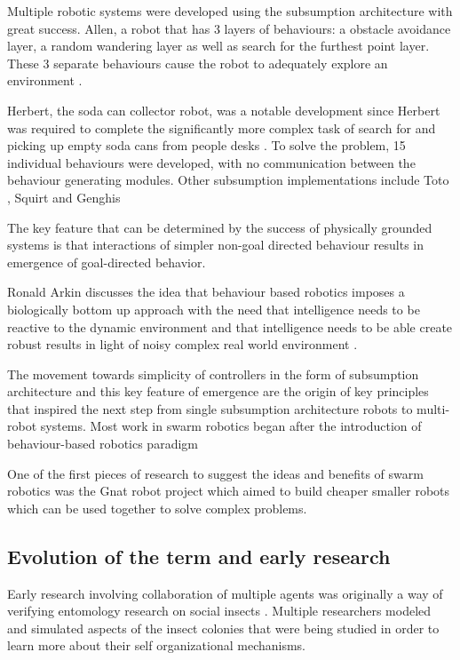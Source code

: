 Multiple robotic systems were developed using the subsumption architecture with great success. Allen, a robot that has 3 layers of behaviours: a obstacle avoidance layer, a random wandering layer as well as search for the furthest point layer. These 3 separate behaviours cause the robot to adequately explore an environment \cite{brooks1986robust}.

Herbert, the soda can collector robot, was a notable development since Herbert was required to complete the significantly more complex task of search for and picking up empty soda cans from people desks \cite{connell1989colony}. To solve the problem, 15 individual behaviours were developed, with no communication between the behaviour generating modules. Other subsumption implementations include Toto \cite{mataric1990distributed}, Squirt \cite{flynn1989world} and Genghis \cite{brooks1989robot}

The key feature that can be determined by the success of physically grounded systems is that interactions of simpler non-goal directed behaviour results in emergence of goal-directed behavior. 

Ronald Arkin discusses the idea that behaviour based robotics imposes a biologically bottom up approach with the need that intelligence needs to be reactive to the dynamic environment and that intelligence needs to be able create robust results in light of noisy complex real world environment \cite{arkin1990integrating}. %

The movement towards simplicity of controllers in the form of subsumption architecture and this key feature of emergence are the origin of key principles that inspired the next step from single subsumption architecture robots to multi-robot systems. Most work in swarm robotics began after the introduction of behaviour-based robotics paradigm \cite{arai2002editorial}

One of the first pieces of research to suggest the ideas and benefits of swarm robotics was the Gnat robot project \cite{flynn1987gnat} which aimed to build cheaper smaller robots which can be used together to solve complex problems.


\subsection{Evolution of the term and early research}
\label{early-research}

Early research involving collaboration of multiple agents was originally a way of verifying entomology research on social insects \cite{dorigo2014swarm, beni1993swarm, seeley2009wisdom}. Multiple researchers modeled and simulated aspects of the insect colonies that were being studied in order to learn more about their self organizational mechanisms. 

